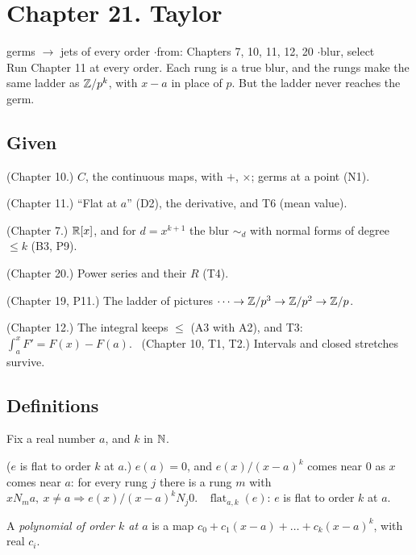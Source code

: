 \newpage

\section*{Chapter 21. Taylor}
\begin{center}
{\normalsize germs $\to$ jets of every order \quad$\cdot$\quad from: Chapters 7, 10, 11, 12, 20 \quad$\cdot$\quad blur, select}\\[4pt]
{\small Run Chapter 11 at every order. Each rung is a true blur, and the rungs make the same ladder as $\mathbb{Z}/p^k$, with $x - a$ in place of $p$. But the ladder never reaches the germ.}
\end{center}

\subsection*{Given}

\begin{lines}
\item[\lab{G1}] (Chapter 10.) $C$, the continuous maps, with $+$, $\times$; germs at a point (N1).
\item[\lab{G2}] (Chapter 11.) ``Flat at $a$'' (D2), the derivative, and T6 (mean value).
\item[\lab{G3}] (Chapter 7.) $\mathbb{R}[x]$, and for $d = x^{k+1}$ the blur $\sim_d$ with normal forms of degree $\le k$ (B3, P9).
\item[\lab{G4}] (Chapter 20.) Power series and their $R$ (T4).
\item[\lab{G5}] (Chapter 19, P11.) The ladder of pictures $\dots \to \mathbb{Z}/p^3 \to \mathbb{Z}/p^2 \to \mathbb{Z}/p$.
\item[\lab{G6}] (Chapter 12.) The integral keeps $\le$ (A3 with A2), and T3: $\int_a^x F' = F(x) - F(a)$. \ (Chapter 10, T1, T2.) Intervals and closed stretches survive.
\end{lines}

\subsection*{Definitions}

\begin{lines}
\item[\lab{D1}] Fix a real number $a$, and $k$ in $\mathbb{N}$.
\item[\lab{D2}] ($e$ is flat to order $k$ at $a$.) $e(a) = 0$, and $e(x)/(x - a)^k$ comes near $0$ as $x$ comes near $a$: for every rung $j$ there is a rung $m$ with $x \mathrel{N_m} a,\ x \neq a \Rightarrow e(x)/(x - a)^k \mathrel{N_j} 0$. \ $\operatorname{flat}_{a,k}(e)$: $e$ is flat to order $k$ at $a$.
\item[\lab{D3}] A \emph{polynomial of order $k$ at $a$} is a map $c_0 + c_1 (x - a) + \dots + c_k (x - a)^k$, with real $c_i$.
\end{lines}

